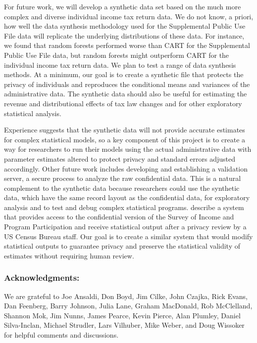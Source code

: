 \documentclass[11pt,runningheads,oribibl]{llncs}
\begin{document}
For future work, we will develop a synthetic data set based on the much more complex and diverse individual income tax return data. We do not know, a priori, how well the data synthesis methodology used for the Supplemental Public Use File data will replicate the underlying distributions of these data. For instance, we found that random forests performed worse than CART for the Supplemental Public Use File data, but random forests might outperform CART for the individual income tax return data. We plan to test a range of data synthesis methods. At a minimum, our goal is to create a synthetic file that protects the privacy of individuals and reproduces the conditional means and variances of the administrative data. The synthetic data should also be useful for estimating the revenue and distributional effects of tax law changes and for other exploratory statistical analysis. 

Experience suggests that the synthetic data will not provide accurate estimates for complex statistical models, so a key component of this project is to create a way for researchers to run their models using the actual administrative data with parameter estimates altered to protect privacy and standard errors adjusted accordingly. Other future work includes developing and establishing a validation server, a secure process to analyze the raw confidential data. This is a natural complement to the synthetic data because researchers could use the synthetic data, which have the same record layout as the confidential data, for exploratory analysis and to test and debug complex statistical programs. \citet{abowd2008protective} describe a system that provides access to the confidential version of the Survey of Income and Program Participation and receive statistical output after a privacy review by a US Census Bureau staff. Our goal is to create a similar system that would modify statistical outputs to guarantee privacy and preserve the statistical validity of estimates without requiring human review. 

\subsubsection{Acknowledgments:}
We are grateful to Joe Ansaldi, Don Boyd, Jim Cilke, John Czajka, Rick Evans, Dan Feenberg, Barry Johnson, Julia Lane, Graham MacDonald, Rob McClelland, Shannon Mok, Jim Nunns, James Pearce, Kevin Pierce, Alan Plumley, Daniel Silva-Inclan, Michael Strudler, Lars Vilhuber, Mike Weber, and Doug Wissoker for helpful comments and discussions.
\end{document}
